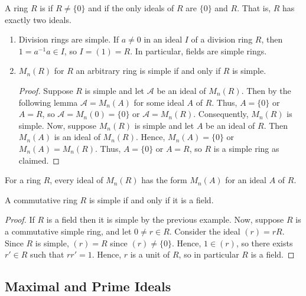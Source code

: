 \documentclass[12pt, a4paper, oneside, openright, titlepage]{book}
\begin{document}
\begin{defn}
    A ring $R$ is  if $R \neq \{0\}$ and if the only ideals of $R$ are $\{0\}$ and $R$. That is, $R$ has exactly two ideals.
\end{defn}

\begin{eg}
    \leavevmode
    \begin{enumerate}
        \item Division rings are simple. If $a \neq 0$ in an ideal $I$ of a division ring $R$, then $1 = a^{-1}a \in I$, so $I = (1) = R$. In particular, fields are simple rings.
        \item $M_n(R)$ for $R$ an arbitrary ring is simple if and only if $R$ is simple.
        \begin{proof}
            Suppose $R$ is simple and let $\mathcal{A}$ be an ideal of $M_n(R)$. Then by the following lemma $\mathcal{A} = M_n(A)$ for some ideal $A$ of $R$. Thus, $A = \{0\}$ or $A = R$, so $\mathcal{A} = M_n(0) = \{0\}$ or $\mathcal{A} = M_n(R)$. Consequently, $M_n(R)$ is simple. Now, suppose $M_n(R)$ is simple and let $A$ be an ideal of $R$. Then $M_n(A)$ is an ideal of $M_n(R)$. Hence, $M_n(A) = \{0\}$ or $M_n(A) = M_n(R)$. Thus, $A = \{0\}$ or $A = R$, so $R$ is a simple ring as claimed.
        \end{proof}
    \end{enumerate}
\end{eg}

\begin{lem}
    For a ring $R$, every ideal of $M_n(R)$ has the form $M_n(A)$ for an ideal $A$ of $R$.
\end{lem}

\begin{prop}
    A commutative ring $R$ is simple if and only if it is a field.
    \begin{proof}
        If $R$ is a field then it is simple by the previous example. Now, suppose $R$ is a commutative simple ring, and let $0 \neq r \in R$. Consider the ideal $(r) = rR$. Since $R$ is simple, $(r) = R$ since $(r) \neq \{0\}$. Hence, $1 \in (r)$, so there exists $r' \in R$ such that $rr' = 1$. Hence, $r$ is a unit of $R$, so in particular $R$ is a field.
    \end{proof}
\end{prop}

\subsection{\textsection Maximal and Prime Ideals}
\end{document}
